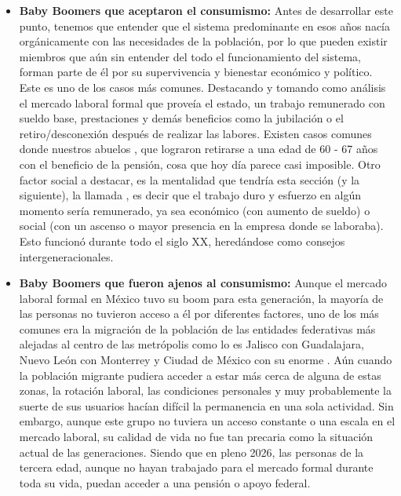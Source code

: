 \begin{itemize}
    \item \textbf{Baby Boomers que aceptaron el consumismo:} Antes de desarrollar este punto, tenemos que entender que el sistema predominante
            en esos años nacía orgánicamente con las necesidades de la población, por lo que pueden existir miembros que aún sin entender del todo
            el funcionamiento del sistema, forman parte de él por su supervivencia y bienestar económico y político. Este es uno de los casos más comunes.
            Destacando y tomando como análisis el mercado laboral formal que proveía el estado, un trabajo remunerado con sueldo base, prestaciones y demás
            beneficios como la jubilación o el retiro/desconexión después de realizar las labores. Existen casos comunes donde nuestros abuelos
            , que lograron retirarse a una edad de 60 - 67 años con el beneficio de la pensión,
            cosa que hoy día parece casi imposible. Otro factor social a destacar, es la mentalidad que tendría esta sección (y la siguiente), la llamada
            , es decir que el trabajo duro y esfuerzo en algún momento sería remunerado, ya sea económico (con aumento de sueldo) o
            social (con un ascenso o mayor presencia en la empresa donde se laboraba). Esto funcionó durante todo el siglo XX, heredándose como consejos
            intergeneracionales.

    \item \textbf{Baby Boomers que fueron ajenos al consumismo:} Aunque el mercado laboral formal en México tuvo su boom para esta generación, la mayoría de las
            personas no tuvieron acceso a él por diferentes factores, uno de los más comunes era la migración de la población de las entidades federativas más
            alejadas al centro de las metrópolis como lo es Jalisco con Guadalajara, Nuevo León con Monterrey y Ciudad de México con su enorme \zmvm. Aún cuando
            la población migrante pudiera acceder a estar más cerca de alguna de estas zonas, la rotación laboral, las condiciones personales y muy probablemente
            la suerte de sus usuarios hacían difícil la permanencia en una sola actividad. Sin embargo, aunque este grupo no tuviera un acceso constante o una
            escala en el mercado laboral, su calidad de vida no fue tan precaria como la situación actual de las generaciones. Siendo que en pleno 2026, las personas
            de la tercera edad, aunque no hayan trabajado para el mercado formal durante toda su vida, puedan acceder a una pensión o apoyo federal.

\end{itemize}

